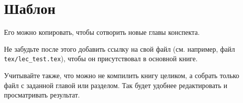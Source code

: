 \documentclass[../../main.tex]{subfiles}
\begin{document}
\section{Шаблон}

Его можно копировать, чтобы сотворить новые главы конспекта.

Не забудьте после этого добавить ссылку на свой файл
(см. например, файл \texttt{tex/lec\_test.tex}), 
чтобы он присутствовал в основной книге.

Учитывайте также, что можно не компилить книгу целиком, а собрать только файл 
с заданной главой или разделом. Так будет удобнее редактировать 
и просматривать результат.
\end{document}
